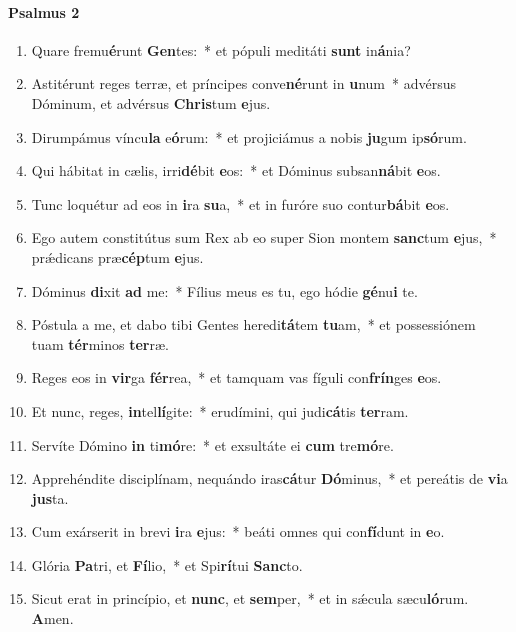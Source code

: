 \documentclass[twoside]{article}
\begin{document}
\begin{paracol}[1]{2}
\switchcolumn*
\paragraph{Psalmus 2}


\begin{enumerate}[wide, itemsep=0mm, labelwidth=!, labelindent=0pt, label=\color{gregoriocolor}\theenumi]
\item Quare fremu\textbf{é}runt \textbf{Gen}tes:~* et pópuli meditáti \textbf{sunt} in\textbf{á}nia?
\item Astitérunt reges terræ, et príncipes conve\textbf{né}runt in \textbf{u}num~* advérsus Dóminum, et advérsus \textbf{Chris}tum \textbf{e}jus.
\item Dirumpámus víncu\textbf{la} e\textbf{ó}rum:~* et projiciámus a nobis \textbf{ju}gum ip\textbf{só}rum.
\item Qui hábitat in cælis, irri\textbf{dé}bit \textbf{e}os:~* et Dóminus subsan\textbf{ná}bit \textbf{e}os.
\item Tunc loquétur ad eos in \textbf{i}ra \textbf{su}a,~* et in furóre suo contur\textbf{bá}bit \textbf{e}os.
\item Ego autem constitútus sum Rex ab eo super Sion montem \textbf{sanc}tum \textbf{e}jus,~* prǽdicans præ\textbf{cép}tum \textbf{e}jus.
\item Dóminus \textbf{di}xit \textbf{ad} me:~* Fílius meus es tu, ego hódie \textbf{gé}nu\textbf{i} te.
\item Póstula a me, et dabo tibi Gentes heredi\textbf{tá}tem \textbf{tu}am,~* et possessiónem tuam \textbf{tér}minos \textbf{ter}ræ.
\item Reges eos in \textbf{vir}ga \textbf{fér}rea,~* et tamquam vas fíguli con\textbf{frín}ges \textbf{e}os.
\item Et nunc, reges, \textbf{in}tel\textbf{lí}gite:~* erudímini, qui judi\textbf{cá}tis \textbf{ter}ram.
\item Servíte Dómino \textbf{in} ti\textbf{mó}re:~* et exsultáte ei \textbf{cum} tre\textbf{mó}re.
\item Apprehéndite disciplínam, nequándo iras\textbf{cá}tur \textbf{Dó}minus,~* et pereátis de \textbf{vi}a \textbf{jus}ta.
\item Cum exárserit in brevi \textbf{i}ra \textbf{e}jus:~* beáti omnes qui con\textbf{fí}dunt in \textbf{e}o.
\item Glória \textbf{Pa}tri, et \textbf{Fí}lio,~* et Spi\textbf{rí}tui \textbf{Sanc}to.
\item Sicut erat in princípio, et \textbf{nunc}, et \textbf{sem}per,~* et in sǽcula sæcu\textbf{ló}rum. \textbf{A}men.
\end{enumerate}


\end{paracol}
\end{document}
